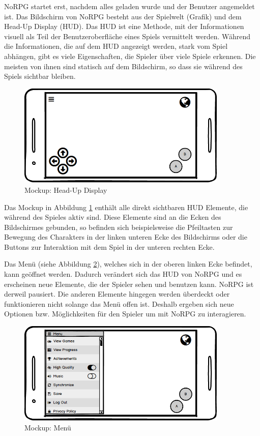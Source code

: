 			NoRPG startet erst, nachdem alles geladen wurde und der Benutzer angemeldet ist. Das Bildschirm von NoRPG besteht aus der Spielwelt (Grafik) und dem Head-Up Display (HUD). Das HUD ist eine Methode, mit der Informationen visuell als Teil der Benutzeroberfläche eines Spiels vermittelt werden. Während die Informationen, die auf dem HUD angezeigt werden, stark vom Spiel abhängen, gibt es viele Eigenschaften, die Spieler über viele Spiele erkennen. Die meisten von ihnen sind statisch auf dem Bildschirm, so dass sie während des Spiels sichtbar bleiben.  
			
			\begin{figure}[htbp]
				\centering 
				\label{mockupHUD}
				\includegraphics[width=10cm]{pics/HUD.png}
				\caption{Mockup: Head-Up Display}
			\end{figure}
			
			Das Mockup in Abbildung \ref{mockupHUD} enthält alle direkt sichtbaren HUD Elemente, die während des Spieles aktiv sind. Diese Elemente sind an die Ecken des Bildschirmes gebunden, so befinden sich beispielsweise die Pfeiltasten zur Bewegung des Charakters in der linken unteren Ecke des Bildschirms oder die Buttons zur Interaktion mit dem Spiel in der unteren rechten Ecke. 
			
			Das Menü (siehe Abbildung \ref{mockupMenu}), welches sich in der oberen linken Ecke befindet, kann geöffnet werden. Dadurch verändert sich das HUD von NoRPG und es erscheinen neue Elemente, die der Spieler sehen und benutzen kann. NoRPG ist derweil pausiert. Die anderen Elemente hingegen werden überdeckt oder funktionieren nicht solange das Menü offen ist. Deshalb ergeben sich neue Optionen bzw. Möglichkeiten für den Spieler um mit NoRPG zu interagieren.
			
			\begin{figure}[htbp]
				\centering 
				\label{mockupMenu}
				\includegraphics[width=10cm]{pics/Menu.png}
				\caption{Mockup: Menü}
			\end{figure}
			
